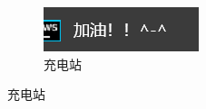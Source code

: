 \documentclass[supercite]{Experimental_Report}
\theoremstyle{definition}
\begin{document}
\begin{figure}[htb]
	\begin{subfigure}[b]{0.4\textwidth}
		\includegraphics[width=\textwidth]{images/e7.png}
		\caption{充电站}
		\label{fig8-5}
	\end{subfigure}
\end{figure}
\end{document}
